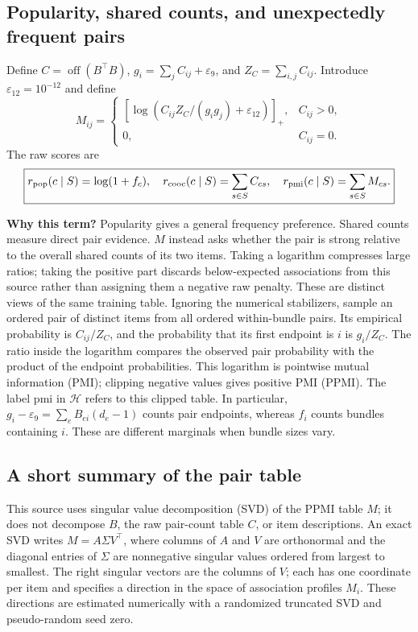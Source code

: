 \documentclass[11pt,a4paper]{article}
\newcommand{\off}{\operatorname{off}}\newcommand{\diag}{\operatorname{diag}}
\newcommand{\why}{\par\textbf{Why this term?} }
\numberwithin{equation}{section}
\begin{document}
\subsection{Popularity, shared counts, and unexpectedly frequent pairs}
Define $C=\off(B^\top B)$, $g_i=\sum_j C_{ij}+\varepsilon_9$, and
$Z_C=\sum_{i,j}C_{ij}$. Introduce $\varepsilon_{12}=10^{-12}$ and define
\begin{equation}
 M_{ij}=\begin{cases}
 [\log(C_{ij}Z_C/(g_i g_j)+\varepsilon_{12})]_+,&C_{ij}>0,\\
 0,&C_{ij}=0.
 \end{cases}
\end{equation}
The raw scores are
\begin{equation}
 \boxed{r_{\rm pop}(c\mid S)=\log(1+f_c),\quad
 r_{\rm cooc}(c\mid S)=\sum_{s\in S}C_{cs},\quad
 r_{\rm pmi}(c\mid S)=\sum_{s\in S}M_{cs}.}
\end{equation}
\why Popularity gives a general frequency preference. Shared counts measure direct
pair evidence. $M$ instead asks whether the pair is strong relative to the overall shared
counts of its two items. Taking a logarithm compresses large ratios; taking the positive part discards below-expected associations from this source rather than assigning them a negative raw penalty. These are distinct views of the same training table.
Ignoring the numerical stabilizers, sample an ordered pair of distinct items
from all ordered within-bundle pairs. Its empirical probability is
$C_{ij}/Z_C$, and the probability that its first endpoint is $i$ is
$g_i/Z_C$. The ratio inside the logarithm compares the observed pair probability
with the product of the endpoint probabilities. This logarithm is pointwise
mutual information (PMI); clipping negative values gives positive PMI (PPMI).
The label $\mathrm{pmi}$ in $\mathcal H$ refers to this clipped table. In particular,
$g_i-\varepsilon_9=\sum_eB_{ei}(d_e-1)$ counts pair endpoints, whereas $f_i$
counts bundles containing $i$. These are different marginals when bundle sizes vary.

\subsection{A short summary of the pair table}
This source uses singular value decomposition (SVD) of the PPMI table $M$;
it does not decompose $B$, the raw pair-count table $C$, or item descriptions.
An exact SVD writes $M=A\Sigma V^\top$, where columns of $A$ and $V$ are
orthonormal and the diagonal entries of $\Sigma$ are nonnegative singular values
ordered from largest to smallest. The right singular vectors are the columns of
$V$; each has one coordinate per item and specifies a direction in the space of
association profiles $M_i$. These directions are estimated numerically with a
randomized truncated SVD and pseudo-random seed zero.
\end{document}
